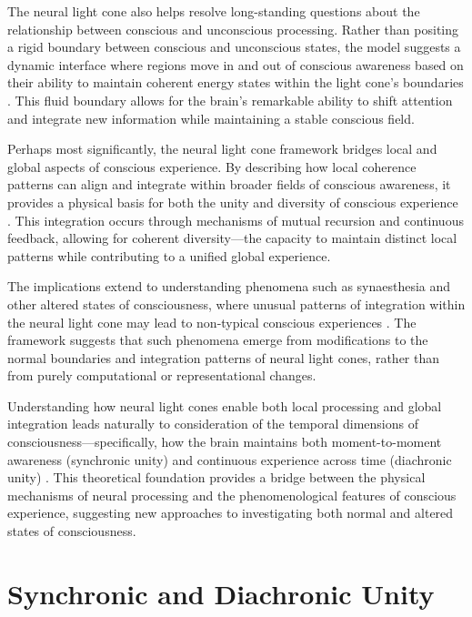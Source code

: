 \begin{refsection}
The neural light cone also helps resolve long-standing questions about the relationship between conscious and unconscious processing. Rather than positing a rigid boundary between conscious and unconscious states, the model suggests a dynamic interface where regions move in and out of conscious awareness based on their ability to maintain coherent energy states within the light cone's boundaries \cite{tononi1998consciousness}. This fluid boundary allows for the brain's remarkable ability to shift attention and integrate new information while maintaining a stable conscious field.

Perhaps most significantly, the neural light cone framework bridges local and global aspects of conscious experience. By describing how local coherence patterns can align and integrate within broader fields of conscious awareness, it provides a physical basis for both the unity and diversity of conscious experience \cite{ramachandran2001synaesthesia}. This integration occurs through mechanisms of mutual recursion and continuous feedback, allowing for coherent diversity—the capacity to maintain distinct local patterns while contributing to a unified global experience.

The implications extend to understanding phenomena such as synaesthesia and other altered states of consciousness, where unusual patterns of integration within the neural light cone may lead to non-typical conscious experiences \cite{abraham1996metaplasticity}. The framework suggests that such phenomena emerge from modifications to the normal boundaries and integration patterns of neural light cones, rather than from purely computational or representational changes.

Understanding how neural light cones enable both local processing and global integration leads naturally to consideration of the temporal dimensions of consciousness—specifically, how the brain maintains both moment-to-moment awareness (synchronic unity) and continuous experience across time (diachronic unity) \cite{hoel2017when}. This theoretical foundation provides a bridge between the physical mechanisms of neural processing and the phenomenological features of conscious experience, suggesting new approaches to investigating both normal and altered states of consciousness.

\section{Synchronic and Diachronic Unity}


\end{refsection}

